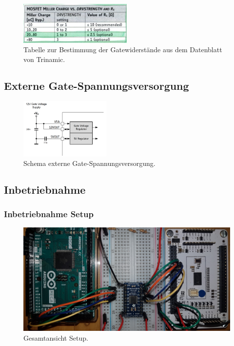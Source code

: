 \begin{appendix}
\begin{figure}[h!]
	\centering
	\includegraphics[width=0.5\textwidth]{graphics/Tabelle_Gatewiderstaende.png}
	\caption{Tabelle zur Bestimmung der Gatewiderstände aus dem Datenblatt von Trinamic.}
	\label{fig:Tabelle_Gatewiderstaende}
\end{figure}

\subsection{Externe Gate-Spannungsversorgung}

\begin{figure}[h!]
	\centering
	\includegraphics[width=0.4\textwidth]{graphics/Schema_Gate_Treiber_Gatespannung}
	\caption{Schema externe Gate-Spannungsversorgung.}
	\label{fig:Schema_Gate_Treiber_Gatespannung}
\end{figure}

\newpage

\subsection{Inbetriebnahme}

\subsubsection{Inbetriebnahme Setup}\label{Appendix:TMC6200_Setup}

\begin{figure}[h!]
	\centering
	\includegraphics[angle=270,width=\textwidth]{graphics/1_komplett}
	\caption{Gesamtansicht Setup.}
	\label{fig:1_komplett}
\end{figure}


\end{appendix}
